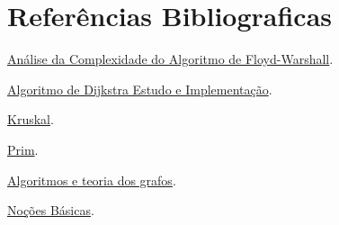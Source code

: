 \documentclass[12pt, fleqn]{article}
\begin{document}
    \newpage
    \section{Referências Bibliograficas}
    \par \href{http://www.inf.ufrgs.br/~cgdaudt/inf05515/art1.pdf}{Análise da Complexidade do Algoritmo de Floyd-Warshall}.
    \par \href{http://claudiaboeres.pbworks.com/f/apresentacao-JoseAlexandre-e-Maycon.pdf}{Algoritmo de Dijkstra Estudo e Implementação}.
    \par \href{http://www.professeurs.polymtl.ca/michel.gagnon/Disciplinas/Bac/Grafos/Arvores/arvores.html#Kruskal}{Kruskal}.
    \par \href{http://www.professeurs.polymtl.ca/michel.gagnon/Disciplinas/Bac/Grafos/Arvores/arvores.html#Prim}{Prim}.
    \par \href{http://www.professeurs.polymtl.ca/michel.gagnon/Disciplinas/Bac/Grafos/index_grafos.html}{Algoritmos e teoria dos grafos}.
    \par \href{http://www.inf.ufpr.br/andre/Disciplinas/BSc/CI065/michel/Intro/intro.html}{Noções Básicas}.
    
    
\end{document}
